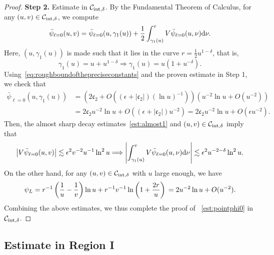 \documentclass[a4paper,reqno]{amsart}
\theoremstyle{definition}
\numberwithin{equation}{section}
\def \d {{\rm{d}}}
\def\ep{\epsilon}
\def\lab{\label}
\begin{document}
\begin{proof}
\smallskip
\textbf{Step 2.} Estimate in $\mathcal{C}_{{\rm{int}},\delta}$.
By the Fundamental Theorem of Calculus, for any $(u,v)\in \mathcal{C}_{{\rm{int}},\delta}$, we compute
\begin{equation*}
\bar{\psi}_{\ell=0}(u,v)=\bar{\psi}_{\ell=0}(u,\gamma_{1}(u))+\frac{1}{2}\int_{\gamma_{1}(u)}^{v}
V\bar{\psi}_{\ell=0}(u,\nu)\d \nu.
\end{equation*}
Here, $(u,\gamma_{1}(u))$ is made such that it lies in the curve $r=\frac{1}{2}u^{1-\delta}$, that is,
\begin{equation*}
\gamma_{1}(u)=u+u^{1-\delta}\Longrightarrow \gamma_{1}(u)=u\left(1+u^{-\delta}\right).
\end{equation*}
Using~\eqref{eq:roughboundofthepreciseconstants} and the proven estimate in Step 1, we check that
\begin{equation*}
\begin{aligned}
    \bar{\psi}_{\ell=0}(u,\gamma_{1}(u))
    &=\left(2\mathfrak{c}_{2}+O((\ep+|\mathfrak{c}_{2}|)(\ln u)^{-1})\right)
    \left(u^{-2}\ln u+O(u^{-2})\right)\\
   & =2\mathfrak{c}_{2}u^{-2}\ln u+O\left((\ep+|\mathfrak{c}_{2}|)u^{-2}\right)=2\mathfrak{c}_{2}u^{-2}\ln u+O(\ep u^{-2}).
    \end{aligned}
\end{equation*}
Then, the almost sharp decay estimates~\eqref{est:almost1} and $(u,v)\in \mathcal{C}_{\rm{int},\delta}$ imply that
\begin{equation*}
    \left|V\bar{\psi}_{\ell=0}(u,v)\right|\lesssim \ep^2 v^{-2}u^{-1}\ln^{2}u\Longrightarrow
    \left|\int_{\gamma_{1}(u)}^{v}V\bar{\psi}_{\ell=0}(u,\nu)\d \nu\right|\lesssim \ep^{2} u^{-2-\delta}\ln^{2}u.
\end{equation*}
On the other hand, for any $(u,v)\in \mathcal{C}_{\rm{int},\delta}$ with $u$ large enough, we have 
\begin{equation*}
    \psi_{L}
    =r^{-1}\left(\frac{1}{u}-\frac{1}{v}\right)\ln u
    +r^{-1}v^{-1}\ln\left(1+\frac{2r}{u}\right)\\
 =
 2u^{-2}\ln u+O(u^{-2}).
\end{equation*}
Combining the above estimates, we thus complete the proof of 
~\eqref{est:pointphi0} in $\mathcal{C}_{{\rm{int}},\delta}$.
\end{proof}



 \subsection{Estimate in Region I} 
 \lab{subsect:precise:regionI}
 
\end{document}
